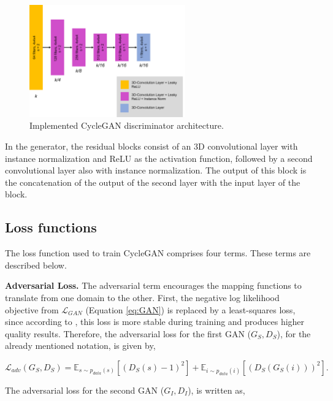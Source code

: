 \begin{figure}[!htb]
  \centering
  \includegraphics[width=0.60\textwidth]{Images/discriminator_cyclegan.jpg}
  \caption[Implemented CycleGAN discriminator architecture.]{Implemented CycleGAN discriminator architecture.}
  \label{fig:disccyc}
\end{figure}

In the generator, the residual blocks consist of an \ac{3D} convolutional layer with instance normalization and ReLU as the activation function, followed by a second convolutional layer also with instance normalization.  The output of this block is the concatenation of the output of the second layer with the input layer of the block.

\subsection*{Loss functions}

The loss function used to train CycleGAN comprises four terms. These terms are described below.

\textbf{Adversarial Loss.} The adversarial term encourages the mapping functions to translate from one domain to
the other. First, the negative log likelihood objective from $\mathcal{L}_{GAN}$  (Equation \ref{eq:GAN}) is replaced by a least-squares loss, since according to \cite{cycleGAN:original}, this loss is more stable during training and produces higher quality results. Therefore, the adversarial loss for the first GAN ($G_{S}, D_S$), for the already mentioned notation, is given by,

\begin{equation}
    \mathcal{L}_{adv}(G_{S},D_S) = \mathbb{E}_{s \sim p_{data}(s)} [(D_S(s)-1)^2] + \mathbb{E}_{i \sim p_{data}(i)} [(D_S(G_{S}(i)))^2].
\end{equation}

The adversarial loss for the second GAN ($G_{I}, D_I$), is written as,

